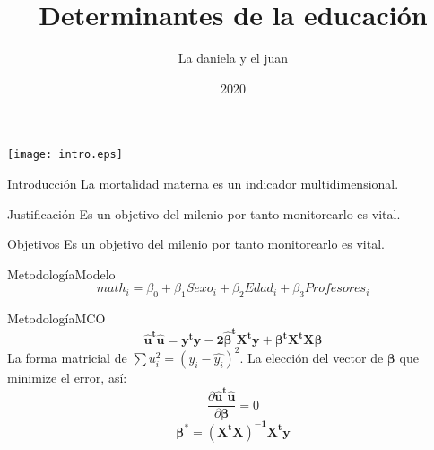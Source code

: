 \documentclass{beamer}
\institute{BIT}
\date{2020}
\title[BIT] %
{Determinantes de la educación }
\subtitle{}
\author[Daniela \& Juan] 
{
La daniela y el juan}
\institute[] 
{
  BIT\\
  \and
  
\textbf{carlos@gmail.com}
}
\date[BIT] %
\begin{document}
\frame{\titlepage}


\begin{frame}
\texttt{[image: intro.eps]}
\end{frame}


\begin{frame}{Introducción}
La mortalidad materna es un indicador multidimensional.
\end{frame}

\begin{frame}{Justificación}
Es un objetivo del milenio por tanto monitorearlo es vital.
\end{frame}

\begin{frame}{Objetivos}
Es un objetivo del milenio por tanto monitorearlo es vital.
\end{frame}

\begin{frame}{Metodología}{Modelo}
\begin{equation}
math_{i} = \beta_{0} + \beta_{1}Sexo_{i} + \beta_{2}Edad_{i} + \beta_{3}Profesores_{i}
\end{equation}
\end{frame}

\begin{frame}{Metodología}{MCO}
\begin{equation}
\bm{\hat
{u}^{t}}\bm{\hat{u}} = 
\bm{y^{t}y - 2\hat{\beta}^{t} X^{t}y + \beta^{t}X^{t}X\beta}
\end{equation}
La forma matricial de $\sum u_{i}^{2} = (y_{i} - \hat{y_{i}})^{2}$.
La elección del vector de $\bm{\beta}$ que minimize el error, así:
\begin{equation}
\frac{\partial \bm{\hat
{u}^{t} \hat{u}} }{\partial \bm{\beta}}=0
\end{equation}
\begin{equation}
\bm{\beta^{*}}=
\bm{(X^{t}X)^{-1}X^{t}y}
\end{equation}
\end{frame}
\end{document}
